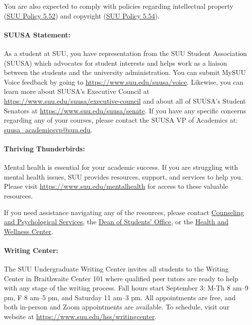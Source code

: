 \documentclass[12pt, letterpaper]{article}
\begin{document}
\noindent
You are also expected to comply with policies regarding intellectual property (\href{https://www.suu.edu/policies/05/52.html}{SUU Policy 5.52}) and copyright (\href{https://www.suu.edu/policies/05/54.html}{SUU Policy 5.54}).

\paragraph{SUUSA Statement:}
As a student at SUU, you have representation from the SUU Student Association (SUUSA) which advocates for student interests and helps work as a liaison between the students and the university administration. You can submit MySUU Voice feedback by going to \href{https://www.suu.edu/suusa/voice}{https://www.suu.edu/suusa/voice}. Likewise, you can learn more about SUUSA’s Executive Council at \href{https://www.suu.edu/suusa/executive-council}{https://www.suu.edu/suusa/executive-council} and about all of SUUSA’s Student Senators at \href{https://www.suu.edu/suusa/senate}{https://www.suu.edu/suusa/senate}. If you have any specific concerns regarding any of your courses, please contact the SUUSA VP of Academics at: \href{suusa_academicsvp@suu.edu}{suusa\_\ignorespaces academicsvp@suu.edu}.

\paragraph{Thriving Thunderbirds:}
Mental health is essential for your academic success. If you are struggling with mental health issues, SUU provides resources, support, and services to help you. Please visit \href{https://www.suu.edu/mentalhealth}{https://www.suu.edu/mentalhealth} for access to these valuable resources.

\noindent
If you need assistance navigating any of the resources, please contact \href{https://www.suu.edu/caps/}{Counseling and Psychological Services}, the \href{https://www.suu.edu/deanofstudents/}{Dean of Students’ Office}, or the \href{https://www.suu.edu/health/}{Health and Wellness Center}.

\paragraph{Writing Center:}
The SUU Undergraduate Writing Center invites all students to the Writing Center in Braithwaite Center 101 where qualified peer tutors are ready to help with any stage of the writing process. Fall hours start September 3: M-Th 8 am–9 pm, F 8 am–5 pm, and Saturday 11 am–3 pm. All appointments are free, and both in-person and Zoom appointments are available. To schedule, visit our website at \href{https://www.suu.edu/hss/writingcenter}{https://www.suu.edu/hss/writingcenter}.
\end{document}
